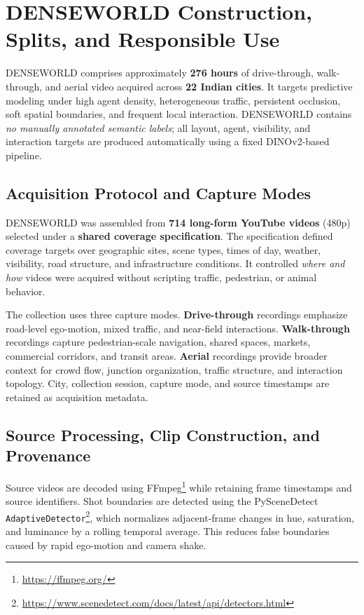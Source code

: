 \section{DENSEWORLD Construction, Splits, and Responsible Use}
\label{app:dataset}

DENSEWORLD comprises approximately \textbf{276 hours} of
drive-through, walk-through, and aerial video acquired across
\textbf{22 Indian cities}. It targets predictive modeling under high
agent density, heterogeneous traffic, persistent occlusion, soft spatial
boundaries, and frequent local interaction. DENSEWORLD contains
\emph{no manually annotated semantic labels}; all layout, agent,
visibility, and interaction targets are produced automatically using a
fixed DINOv2-based pipeline.

\subsection{Acquisition Protocol and Capture Modes}
\label{app:dataset_acquisition}

DENSEWORLD was assembled from \textbf{714 long-form YouTube videos} (480p)
selected under a \textbf{shared coverage specification}.
The specification defined coverage targets over geographic sites,
scene types, times of day, weather, visibility, road structure, and
infrastructure conditions. It controlled \emph{where and how} videos
were acquired without scripting traffic, pedestrian, or animal
behavior.

The collection uses three capture modes. \textbf{Drive-through}
recordings emphasize road-level ego-motion, mixed traffic, and
near-field interactions. \textbf{Walk-through} recordings capture
pedestrian-scale navigation, shared spaces, markets, commercial
corridors, and transit areas. \textbf{Aerial} recordings provide broader
context for crowd flow, junction organization, traffic structure, and
interaction topology. City, collection session, capture mode, and
source timestamps are retained as acquisition metadata.

\subsection{Source Processing, Clip Construction, and Provenance}
\label{app:clip_construction}

Source videos are decoded using
FFmpeg\footnote{\url{https://ffmpeg.org/}} while retaining frame
timestamps and source identifiers. Shot boundaries are detected using
the PySceneDetect
\texttt{AdaptiveDetector}\footnote{\url{https://www.scenedetect.com/docs/latest/api/detectors.html}},
which normalizes adjacent-frame changes in hue, saturation, and
luminance by a rolling temporal average. This reduces false boundaries
caused by rapid ego-motion and camera shake.

